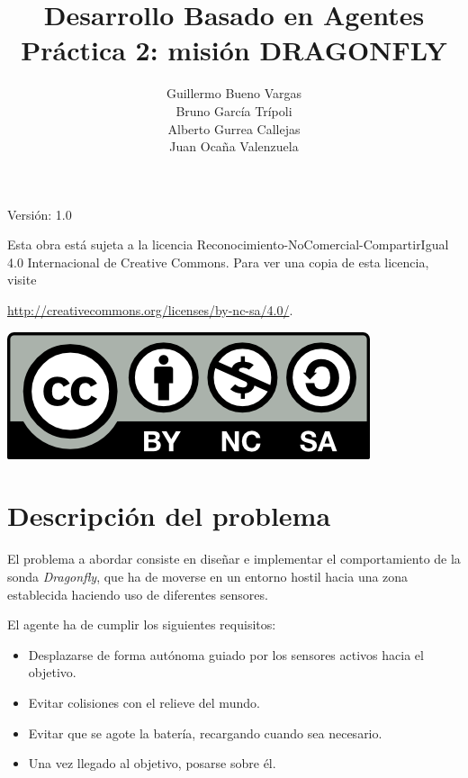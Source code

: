 \documentclass[11pt,a4paper]{article}
\author{Guillermo Bueno Vargas \\ Bruno García Trípoli \\ Alberto Gurrea Callejas \\ Juan Ocaña Valenzuela}
\title{\textbf{Desarrollo Basado en Agentes} \\ 
 Práctica 2: misión DRAGONFLY}
\begin{document}
\thispagestyle{empty}

\maketitle

\begin{center}

Versión: 1.0
\end{center}

\newpage

Esta obra está sujeta a la licencia Reconocimiento-NoComercial-CompartirIgual 4.0 Internacional de Creative Commons. Para ver una copia de esta licencia, visite 

\url{http://creativecommons.org/licenses/by-nc-sa/4.0/}.

\bigskip

\includegraphics[scale=2]{img/by-nc-sa.png}\\[\bigskipamount]

\newpage

\tableofcontents

\newpage

\section{Descripción del problema}

El problema a abordar consiste en diseñar e implementar el comportamiento de la sonda \textit{Dragonfly}, que ha de moverse en un entorno hostil hacia una zona establecida 
haciendo uso de diferentes sensores.

El agente ha de cumplir los siguientes requisitos:

\begin{itemize}
	 \item Desplazarse de forma autónoma guiado por los sensores activos hacia el objetivo.
	 \item Evitar colisiones con el relieve del mundo.
	 \item Evitar que se agote la batería, recargando cuando sea necesario.
	 \item Una vez llegado al objetivo, posarse sobre él.
\end{itemize}
\end{document}
